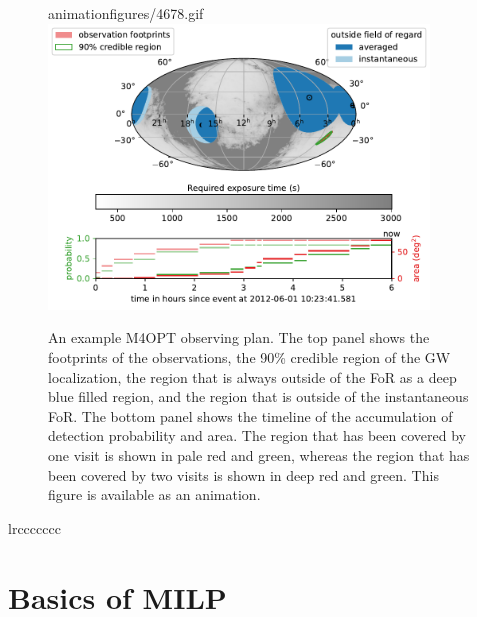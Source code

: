\documentclass[twocolumn,times]{aastex631}
\begin{document}
\begin{figure}
    \begin{interactive}{animation}{figures/4678.gif}
        \includegraphics[width=0.9\textwidth]{figures/4678}
    \end{interactive}
    \caption{\label{fig:example}An example \ac{M4OPT} observing plan. The top panel shows the footprints of the observations, the 90\% credible region of the \ac{GW} localization, the region that is always outside of the \ac{FoR} as a deep blue filled region, and the region that is outside of the instantaneous \ac{FoR}. The bottom panel shows the timeline of the accumulation of detection probability and area. The region that has been covered by one visit is shown in pale red and green, whereas the region that has been covered by two visits is shown in deep red and green. This figure is available as an animation.}
\end{figure}

\begin{deluxetable*}{lrccccccc}
    \startdata
    
    \enddata
\end{deluxetable*}

\section{Basics of MILP}
\end{document}
